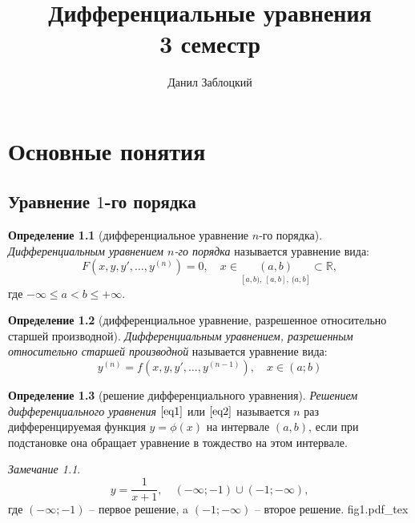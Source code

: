 \documentclass[11pt,a4paper,oneside]{report}
\title{Дифференциальные уравнения \\ 3 семестр}
\author{Данил Заблоцкий}
\theoremstyle{definition}
\newtheorem{definition}{Определение}[section]
\theoremstyle{plain}
\theoremstyle{remark}
\newtheorem*{remark}{Замечание}
\begin{document}
\maketitle
\tableofcontents

\chapter{Основные понятия}

\section{Уравнение $1$-го порядка}

\begin{definition}[дифференциальное уравнение $n$-го порядка]
    \emph{Дифференциальным уравнением $n$-го порядка} называется уравнение вида:
    \begin{equation}\label{eq1}
        F(x,y,y',\ldots,y^{(n)}) = 0, \quad x \in \underset{[a,b), \ [a,b], \ (a,b]}{(a,b)} \subset \mathbb{R},
    \end{equation}
    где $-\infty \leqslant a < b \leqslant +\infty$.
\end{definition}

\begin{definition}[дифференциальное уравнение, разрешенное относительно старшей производной]
    \emph{Дифференциальным уравнением, разрешенным относительно старшей производной} называется уравнение вида:
    \begin{equation}\label{eq2}
        y^{(n)} = f(x,y,y',\ldots,y^{(n-1)}), \quad x \in (a;b)
    \end{equation}
\end{definition}

\begin{definition}[решение дифференциального уравнения]
    \emph{Решением дифференциального уравнения} $\ref{eq1}$ или $\ref{eq2}$ называется $n$ раз дифференцируемая функция $y = \phi(x)$ на интервале $(a,b)$, если при подстановке она обращает уравнение в тождество на этом интервале.
\end{definition}

\begin{remark}
    \begin{equation*}
        y = \frac{1}{x+1}, \quad (-\infty; -1) \cup (-1; -\infty),
    \end{equation*}
    где $(-\infty; -1)$ -- первое решение, a $(-1; -\infty)$ -- второе решение.
    \centering
    \def\svgwidth{0.5\textwidth}
    {fig1.pdf_tex}
\end{remark}
\end{document}
